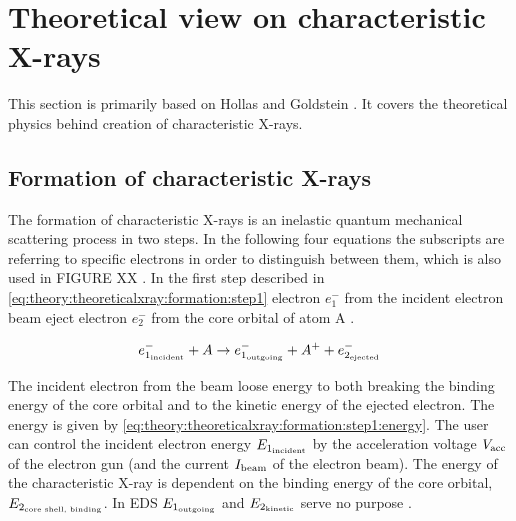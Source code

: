 

\section{Theoretical view on characteristic X-rays}
\label{sec:theory:theoreticalxray}


This section is primarily based on Hollas \cite[Ch. 8.2]{hollas_modern_2004} and Goldstein \cite[Ch. 4.2]{goldstein_scanning_2018}.
It covers the theoretical physics behind creation of characteristic X-rays.

%
%
\subsection{Formation of characteristic X-rays}
\label{sec:theory:theoreticalxray:formation}
The formation of characteristic X-rays is an inelastic quantum mechanical scattering process in two steps.
In the following four equations the subscripts are referring to specific electrons in order to distinguish between them, which is also used in FIGURE XX .
In the first step described in \cref{eq:theory:theoreticalxray:formation:step1} electron $e^-_{1}$ from the incident electron beam eject electron $e^-_{2}$ from the core orbital of atom A \cite[Eq. (8.12)]{hollas_modern_2004}.

\begin{equation}
    \label{eq:theory:theoreticalxray:formation:step1}
    e^-_{1_{\textnormal{incident}}} + A \rightarrow e^-_{1_{\textnormal{outgoing}}} + A^+ + e^-_{2_{\textnormal{ejected}}}
\end{equation}


The incident electron from the beam loose energy to both breaking the binding energy of the core orbital and to the kinetic energy of the ejected electron.
The energy is given by \cref{eq:theory:theoreticalxray:formation:step1:energy}.
The user can control the incident electron energy $E_{1_{\textnormal{incident}}}$ by the acceleration voltage $V_{\textnormal{acc}}$ of the electron gun (and the current $I_{\textnormal{beam}}$ of the electron beam).
The energy of the characteristic X-ray is dependent on the binding energy of the core orbital, $E_{2_{\textnormal{core shell, binding}}}$.
In EDS $E_{1_{\textnormal{outgoing}}}$ and $E_{2_{\textnormal{kinetic}}}$ serve no purpose \cite[Eq. (4.1)]{goldstein_scanning_2018}.

